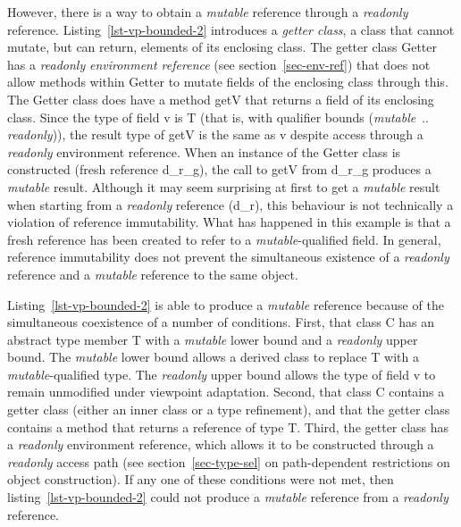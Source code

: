 However, there is a way to obtain a {\em mutable} reference through a {\em readonly}
reference. Listing~\ref{lst-vp-bounded-2} introduces a {\em getter class},
a class that cannot mutate, but can return, elements of its enclosing class.
The getter class {\cd Getter} has a {\em readonly} {\em environment reference}
(see section~\ref{sec-env-ref}) that does not allow methods within {\cd Getter}
to mutate fields of the enclosing class through {\cd this}.
The {\cd Getter} class does have a method {\cd getV} that returns a field of
its enclosing class. Since the type of field {\cd v} is {\cd T} (that is,
with qualifier bounds ({\em mutable}~.. {\em readonly})),
the result type of {\cd getV} is the same as {\cd v} despite access through
a {\em readonly} environment reference.
When an instance of the {\cd Getter} class is constructed (fresh reference {\cd d\_r\_g}),
the call to {\cd getV} from {\cd d\_r\_g} produces a {\em mutable} result.
Although it may seem surprising at first to get a {\em mutable} result
when starting from a {\em readonly} reference ({\cd d\_r}),
this behaviour is not technically a violation of reference immutability.
What has happened in this example is that a fresh reference has been created
to refer to a {\em mutable}-qualified field.
In general, reference immutability does not prevent the simultaneous existence of
a {\em readonly} reference and a {\em mutable} reference to the same object.

Listing~\ref{lst-vp-bounded-2} is able to produce a {\em mutable} reference because
of the simultaneous coexistence of a number of conditions.
First, that class {\cd C} has an abstract type member {\cd T} with a {\em mutable}
lower bound and a {\em readonly} upper bound.
The {\em mutable} lower bound allows a derived class to replace {\cd T} with
a {\em mutable}-qualified type.
The {\em readonly} upper bound allows the type of field {\cd v}
to remain unmodified under viewpoint adaptation.
Second, that class {\cd C} contains a getter class (either an inner class
or a type refinement), and that the getter class
contains a method that returns a reference of type {\cd T}.
Third, the getter class has a {\em readonly} environment reference, which
allows it to be constructed through a {\em readonly} access path (see section~\ref{sec-type-sel}
on path-dependent restrictions on object construction).
If any one of these conditions were not met, then listing~\ref{lst-vp-bounded-2}
could not produce a {\em mutable} reference from a {\em readonly} reference.


